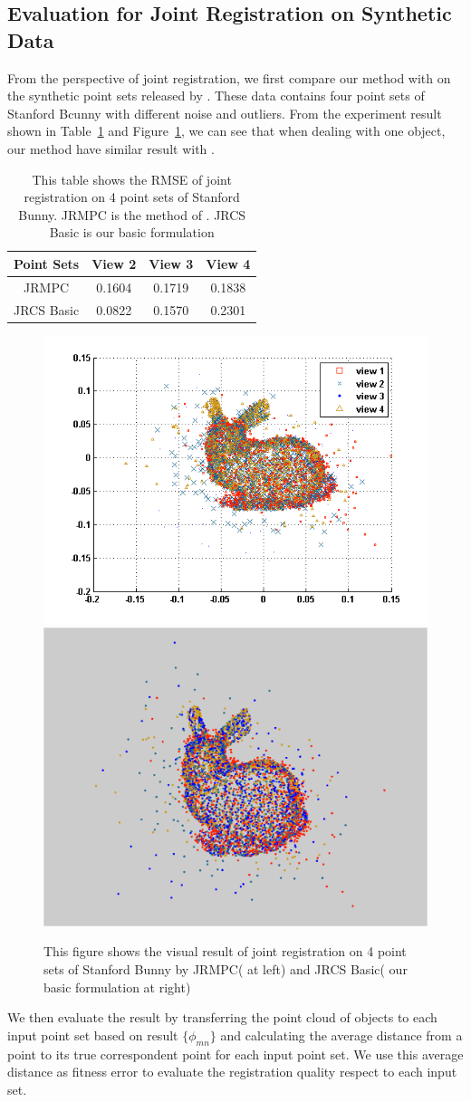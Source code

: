 \subsection{Evaluation for Joint Registration on Synthetic Data}
From the perspective of joint registration, we first compare our method with \cite{Evangelidis2014} on the synthetic point sets released by \cite{Evangelidis2014}. These data contains four point sets of Stanford Bcunny with different noise and outliers. From the experiment result shown in Table~\ref{tab:reg} and Figure~\ref{fig:reg}, we can see that when dealing with one object, our method have similar result with \cite{Evangelidis2014}.
\begin{table}
	\centering
	\caption{This table shows the RMSE of joint registration on 4 point sets of Stanford Bunny. JRMPC is the method of \cite{Evangelidis2014}. JRCS Basic is our basic formulation}
	\begin{tabular}{c c c c}
		Point Sets& View 2 & View 3 & View 4 \\
		\hline
		JRMPC & 0.1604 & 0.1719 & 0.1838\\   
		JRCS Basic & 0.0822 &  0.1570  & 0.2301\\
	\end{tabular}
	\label{tab:reg}
\end{table}
\begin{figure}[htb]
	\centering
	\includegraphics[width=0.4\linewidth]{images/JRMPC.png}
	\includegraphics[width=0.4\linewidth]{images/JRCSReg.png}
	\caption{This figure shows the visual result of joint registration on 4 point sets of Stanford Bunny by JRMPC(\cite{Evangelidis2014} at left) and JRCS Basic( our basic formulation at right) }
	\label{fig:reg}
\end{figure}
We then evaluate the result by transferring the point cloud of objects to each input point set based on result $\{\phi_{mn}\}$ and calculating the average distance from a point to its true correspondent point for each input point set.
We use this average distance as fitness error to evaluate the registration quality respect to each input set.


